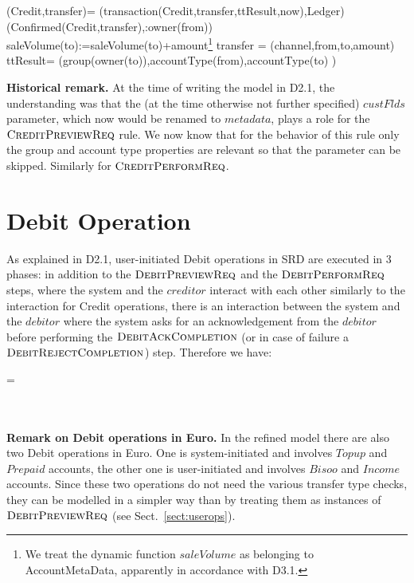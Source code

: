 \begin{asm}
(Credit,transfer)=\+   
   (transaction(Credit,transfer,ttResult,now),Ledger)\\
   (Confirmed(Credit,transfer),\TO :owner(from))\\
   saleVolume(to):=saleVolume(to)+amount\footnote{We treat the dynamic function $saleVolume$ as belonging to AccountMetaData, apparently in accordance with D3.1.} \-
\WHERE \+
 transfer = (channel,from,to,amount)\\
 ttResult= (group(owner(to)),accountType(from),accountType(to) )
\end{asm}



{\bf Historical remark.} At the time of writing the model in D2.1, the understanding was that the (at the time otherwise not further specified) $custFlds$ parameter, which now would be renamed to $metadata$, plays a role for the $\hbox{\sc CreditPreviewReq}$ rule. We now know that for the behavior of this rule only the group and account type properties are relevant so that the parameter can be skipped. Similarly for $\hbox{\sc CreditPerformReq}$.




\section{Debit Operation} 
\label{sect:debitops}

As explained in D2.1, user-initiated Debit operations in SRD are executed in 3 phases: in addition to the $\hbox{\sc DebitPreviewReq}$ and the $\hbox{\sc DebitPerformReq}$ steps, where the system and the $creditor$ interact with each other similarly to the interaction for Credit operations, there is an interaction between the system and the $debitor$ where the system asks for an acknowledgement from the $debitor$ before performing the $\hbox{\sc DebitAckCompletion}$ (or in case of failure a $\hbox{\sc DebitRejectCompletion}$) step. Therefore we have:

\begin{asm}
=\+
    \\
    \\
   \\
\end{asm}

{\bf Remark on Debit operations in Euro.} In the refined model there are also two Debit operations in Euro. One is system-initiated and involves $Topup$ and $Prepaid$ accounts, the other one is user-initiated  and involves $Bisoo$ and $Income$ accounts. Since these two operations do not need the various transfer type checks, they can be modelled in a simpler way than by treating them as instances of $\hbox{\sc DebitPreviewReq}$ (see Sect.~\ref{sect:userops}).

